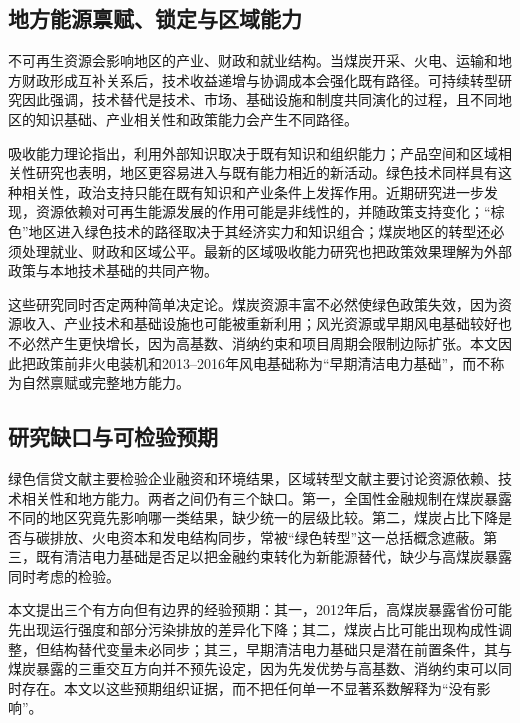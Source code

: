 \documentclass[UTF8,12pt]{ctexart}
\begin{document}
\subsection{地方能源禀赋、锁定与区域能力}

不可再生资源会影响地区的产业、财政和就业结构\parencite{hotelling1931,auty1993,sachswarner2001}。当煤炭开采、火电、运输和地方财政形成互补关系后，技术收益递增与协调成本会强化既有路径\parencite{arthur1989,david1985,unruh2000}。可持续转型研究因此强调，技术替代是技术、市场、基础设施和制度共同演化的过程\parencite{geels2002,markardetal2012}，且不同地区的知识基础、产业相关性和政策能力会产生不同路径\parencite{hansencoenen2015,boschma2017}。

吸收能力理论指出，利用外部知识取决于既有知识和组织能力\parencite{cohenlevinthal1990}；产品空间和区域相关性研究也表明，地区更容易进入与既有能力相近的新活动\parencite{hidalgoetal2007,neffkeetal2011}。绿色技术同样具有这种相关性，政治支持只能在既有知识和产业条件上发挥作用\parencite{santoalhaboschma2021}。近期研究进一步发现，资源依赖对可再生能源发展的作用可能是非线性的，并随政策支持变化\parencite{zhangetal2024resource}；“棕色”地区进入绿色技术的路径取决于其经济实力和知识组合\parencite{grashofbasilico2025}；煤炭地区的转型还必须处理就业、财政和区域公平\parencite{healybarry2017,carleyetal2018,demeterova2024,tassikittner2024,perettoetal2025}。最新的区域吸收能力研究也把政策效果理解为外部政策与本地技术基础的共同产物\parencite{zhaoetal2026}。

这些研究同时否定两种简单决定论。煤炭资源丰富不必然使绿色政策失效，因为资源收入、产业技术和基础设施也可能被重新利用；风光资源或早期风电基础较好也不必然产生更快增长，因为高基数、消纳约束和项目周期会限制边际扩张。本文因此把政策前非火电装机和2013--2016年风电基础称为“早期清洁电力基础”，而不称为自然禀赋或完整地方能力。

\subsection{研究缺口与可检验预期}

绿色信贷文献主要检验企业融资和环境结果，区域转型文献主要讨论资源依赖、技术相关性和地方能力。两者之间仍有三个缺口。第一，全国性金融规制在煤炭暴露不同的地区究竟先影响哪一类结果，缺少统一的层级比较。第二，煤炭占比下降是否与碳排放、火电资本和发电结构同步，常被“绿色转型”这一总括概念遮蔽。第三，既有清洁电力基础是否足以把金融约束转化为新能源替代，缺少与高煤炭暴露同时考虑的检验。

本文提出三个有方向但有边界的经验预期：其一，2012年后，高煤炭暴露省份可能先出现运行强度和部分污染排放的差异化下降；其二，煤炭占比可能出现构成性调整，但结构替代变量未必同步；其三，早期清洁电力基础只是潜在前置条件，其与煤炭暴露的三重交互方向并不预先设定，因为先发优势与高基数、消纳约束可以同时存在。本文以这些预期组织证据，而不把任何单一不显著系数解释为“没有影响”。
\end{document}

